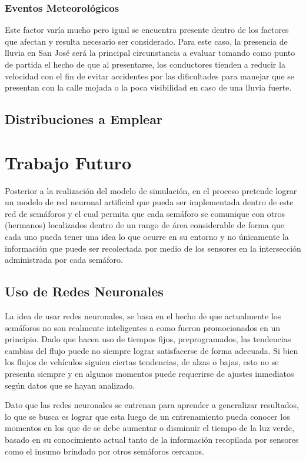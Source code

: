 \documentclass[12pt,journal,compsoc]{IEEEtran}
\begin{document}
\subsubsection{Eventos Meteorol\'{o}gicos}
Este factor var\'{i}a mucho pero igual se encuentra presente dentro de los factores que afectan y resulta necesario ser considerado. Para este caso, la presencia de lluvia en San Jos\'{e} ser\'{a} la principal circunstancia a evaluar tomando como punto de partida el hecho de que al presentarse, los conductores tienden a reducir la velocidad con el fin de evitar accidentes por las dificultades para manejar que se presentan con la calle mojada o la poca visibilidad en caso de una lluvia fuerte.

\subsection{Distribuciones a Emplear}


\section{Trabajo Futuro}
Posterior a la realizaci\'{o}n del modelo de simulaci\'{o}n, en el proceso pretende lograr un modelo de red neuronal artificial que pueda ser implementada dentro de este red de sem\'{a}foros y el cual permita que cada sem\'{a}foro se comunique con otros (hermanos) localizados dentro de un rango de \'{a}rea considerable de forma que cada uno pueda tener una idea lo que ocurre en su entorno y no \'{u}nicamente la informaci\'{o}n que puede ser recolectada por medio de los sensores en la intersecci\'{o}n administrada por cada sem\'{a}foro.

\subsection{Uso de Redes Neuronales}
La idea de usar redes neuronales, se basa en el hecho de que actualmente los sem\'{a}foros no son realmente inteligentes a como fueron promocionados en un principio. Dado que hacen uso de tiempos fijos, preprogramados, las tendencias cambias del flujo puede no siempre lograr satisfacerse de forma adecuada. Si bien los flujos de veh\'{i}culos siguien ciertas tendencias, de alzas o bajas, esto no se presenta siempre y en algunos momentos puede requerirse de ajustes inmediatos seg\'{u}n datos que se hayan analizado.

Dato que las redes neuronales se entrenan para aprender a generalizar resultados, lo que se busca es lograr que esta luego de un entrenamiento pueda conocer los momentos en los que de se debe aumentar o disminuir el tiempo de la luz verde, basado en su conocimiento actual tanto de la informaci\'{o}n recopilada por sensores como el insumo brindado por otros sem\'{a}foros cercanos.
\end{document}
